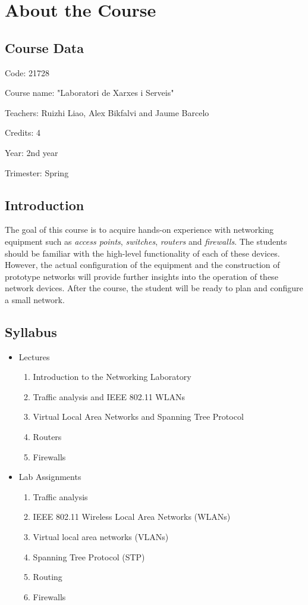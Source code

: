 \chapter{About the Course}

\section{Course Data}

Code: 21728

Course name: "Laboratori de Xarxes i Serveis"

Teachers: Ruizhi Liao, Alex Bikfalvi and Jaume Barcelo

Credits: 4

Year: 2nd year

Trimester: Spring

\section{Introduction}

The goal of this course is to acquire hands-on experience with networking equipment such as \emph{access points}, \emph{switches}, \emph{routers} and \emph{firewalls}. The students should be familiar with the high-level functionality of each of these devices. However, the actual configuration of the equipment and the construction of prototype networks will provide further insights into the operation of these network devices. After the course, the student will be ready to plan and configure a small network.

\section{Syllabus}
\begin{itemize}
  \item Lectures
  \begin{enumerate}
    \item Introduction to the Networking Laboratory
    \item Traffic analysis and IEEE 802.11 WLANs
    \item Virtual Local Area Networks and Spanning Tree Protocol
    \item Routers
    \item Firewalls
  \end{enumerate}
\item Lab Assignments
  \begin{enumerate}
    \item Traffic analysis
    \item IEEE 802.11 Wireless Local Area Networks (WLANs)
    \item Virtual local area networks (VLANs)
    \item Spanning Tree Protocol (STP)
    \item Routing
    \item Firewalls
  \end{enumerate}
\end{itemize}

